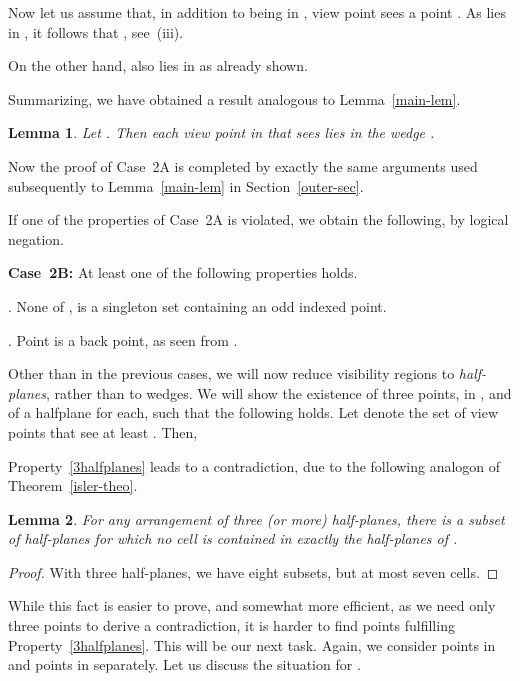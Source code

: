 \documentclass[11pt]{article}
\newtheorem{lemma}{Lemma}
\begin{document}
Now let us assume that, in addition to being in , view point  sees a 
point .
As  lies in , it follows that , see~(iii). 

On the other hand,  also lies in  as already shown.

Summarizing, we have obtained a result analogous to Lemma~\ref{main-lem}. 

\begin{lemma} \label{case2A-lem}
Let . Then each view point in  that 
sees  lies in the wedge .
\end{lemma}

Now the proof of Case~2A is completed by exactly the same arguments used
subsequently to Lemma~\ref{main-lem} in Section~\ref{outer-sec}.  

\bigskip

If one of the properties of Case~2A is violated, we obtain
the following, by logical negation.
\vspace{0.5\baselineskip}

{\bf Case~2B:  } At least one of the following properties holds.

. None of ,  is a singleton set containing an odd indexed point.

. Point  is a back point, as seen from .

\medskip
Other than in the previous cases, we will now reduce visibility regions to {\em half-planes}, rather than to wedges.
We will show the existence of three points,  in , and of a halfplane  
for each, such that the following holds. 
Let  denote the set of view points that see at least .
Then,

Property~\ref{3halfplanes} leads to a contradiction, due to the following analogon of Theorem~\ref{isler-theo}.

\begin{lemma}     \label{isler-lem}
For any arrangement of three (or more) half-planes, there is a subset  of half-planes for which no cell
is contained in exactly the half-planes of .
\end{lemma}
\begin{proof}
With three half-planes, we have eight subsets, but at most seven cells.
\end{proof}
While this fact is easier to prove, and somewhat more efficient, as we need only three points to derive a contradiction, 
it is harder to find points fulfilling Property~\ref{3halfplanes}. This will be our next task.
Again, we consider points in  and points in  separately. Let us discuss the situation for .
\end{document}
